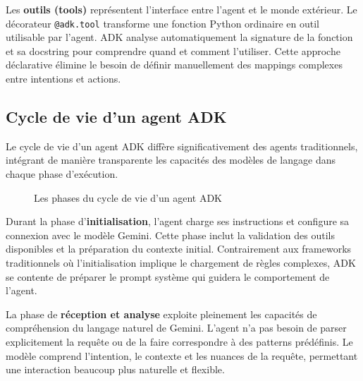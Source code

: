 Les \textbf{outils (tools)} représentent l'interface entre l'agent et le monde extérieur. Le décorateur \texttt{@adk.tool} transforme une fonction Python ordinaire en outil utilisable par l'agent. ADK analyse automatiquement la signature de la fonction et sa docstring pour comprendre quand et comment l'utiliser. Cette approche déclarative élimine le besoin de définir manuellement des mappings complexes entre intentions et actions.

\subsection{Cycle de vie d'un agent ADK}

Le cycle de vie d'un agent ADK diffère significativement des agents traditionnels, intégrant de manière transparente les capacités des modèles de langage dans chaque phase d'exécution.

\begin{figure}[H]
\centering
{}
\caption{Les phases du cycle de vie d'un agent ADK}
\end{figure}

Durant la phase d'\textbf{initialisation}, l'agent charge ses instructions et configure sa connexion avec le modèle Gemini. Cette phase inclut la validation des outils disponibles et la préparation du contexte initial. Contrairement aux frameworks traditionnels où l'initialisation implique le chargement de règles complexes, ADK se contente de préparer le prompt système qui guidera le comportement de l'agent.

La phase de \textbf{réception et analyse} exploite pleinement les capacités de compréhension du langage naturel de Gemini. L'agent n'a pas besoin de parser explicitement la requête ou de la faire correspondre à des patterns prédéfinis. Le modèle comprend l'intention, le contexte et les nuances de la requête, permettant une interaction beaucoup plus naturelle et flexible.

